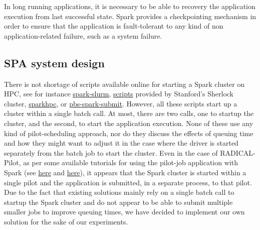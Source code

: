 \documentclass{IEEEtran}
\begin{document}
    In long running applications, it is necessary to be able to recovery the application execution from
    last successful state. Spark provides a checkpointing mechanism in order to ensure that the application
    is fault-tolerant to any kind of non application-related failure, such as a system failure.

    \subsection{SPA system design}

    There is not shortage of scripts available online for starting a Spark cluster on HPC, 
    see for instance \href{https://github.com/NIH-HPC/spark-slurm}{spark-slurm},
    \href{https://www.sherlock.stanford.edu/docs/software/using/spark}{scripts} provided
     by Stanford's Sherlock cluster, \href{https://sparkhpc.readthedocs.io}{sparkhpc},
     or \href{https://www.osc.edu/~troy/pbstools/man/pbs-spark-submit}{pbs-spark-submit}.
    However, all these scripts start up a cluster within a single batch call. At most, there are two calls, one to startup the cluster,
    and the second, to start the application execution. None of these use any kind of pilot-scheduling approach, nor do they discuss the
    effects of queuing time and how they might want to adjust it in the
    case where the driver is started separately from the batch job to start
    the cluster. Even in the case of RADICAL-Pilot, as per some available
    tutorials for using the pilot-job application with
    Spark (see
    \href{https://github.com/radical-cybertools/pilot-streaming/blob/master/examples/Pilot-Streaming-GettingStarted.ipynb}{here}
    and \href{https://github.com/radical-cybertools/MIDAS-tutorial/blob/master/pilot/Pilot-Spark.ipynb}{here}),
    it appears that the Spark cluster is started within a single pilot and
    the application is submitted, in a separate process, to that pilot. Due
    to the fact that existing solutions mainly rely on a single batch call
    to startup the Spark cluster and do not appear to be able to submit
    multiple smaller jobs to improve queuing times, we have decided to
    implement our own solution for the sake of our experiments.
\end{document}
